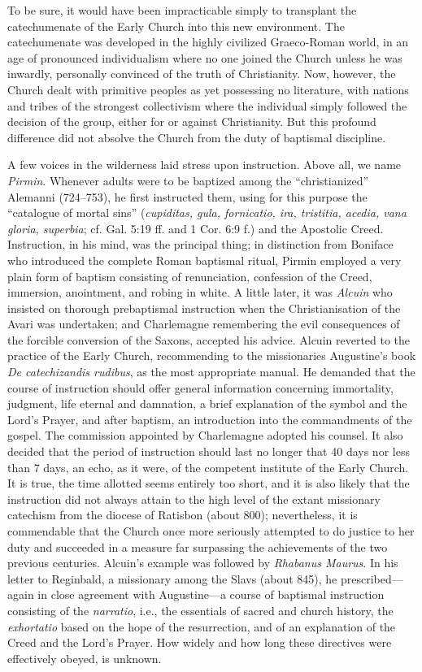 To be sure, it would have been impracticable simply to transplant the catechumenate of the Early Church into this new environment. The catechumenate was developed in the highly civilized Graeco-Roman world, in an age of pronounced individualism where no one joined the Church unless he was inwardly, personally convinced of the truth of Christianity. Now, however, the Church dealt with primitive peoples as yet possessing no literature, with nations and tribes of the strongest collectivism where the individual simply followed the decision of the group, either for or against Christianity. But this profound difference did not absolve the Church from the duty of baptismal discipline.

A few voices in the wilderness laid stress upon instruction.
Above all, we name \emph{Pirmin}. Whenever adults were to be baptized among the “christianized” Alemanni (724–753), he first instructed them, using for this purpose the “catalogue of mortal sins” (\emph{cupiditas, gula, fornicatio, ira, tristitia, acedia, vana gloria, superbia}; cf. Gal. 5:19 ff. and 1 Cor. 6:9 f.) and the Apostolic Creed. Instruction, in his mind, was the principal thing; in distinction from Boniface who introduced the complete Roman baptismal ritual, Pirmin employed a very plain form of baptism consisting of renunciation, confession of the Creed, immersion, anointment, and robing in white. A little later, it was \emph{Alcuin} who insisted on thorough prebaptismal instruction when the Christianisation of the Avari was undertaken; and Charlemagne remembering the evil consequences of the forcible conversion of the Saxons, accepted his advice. Alcuin reverted to the practice of the Early Church, recommending to the missionaries Augustine’s book \emph{De catechizandis rudibus}, as the most appropriate manual. He demanded that the course of instruction should offer general information concerning immortality, judgment, life eternal and damnation, a brief explanation of the symbol and the Lord’s Prayer, and after baptism, an introduction into the commandments of the gospel. The commission appointed by Charlemagne adopted his counsel. It also decided that the period of instruction should last no longer that 40 days nor less than 7 days, an echo, as it were, of the competent institute of the Early Church. It is true, the time allotted seems entirely too short, and it is also likely that the instruction did not always attain to the high level of the extant missionary catechism from the diocese of Ratisbon (about 800); nevertheless, it is commendable that the Church once more seriously attempted to do justice to her duty and succeeded in a measure far surpassing the achievements of the two previous centuries. Alcuin’s example was followed by \emph{Rhabanus Maurus}. In his letter to Reginbald, a missionary among the Slavs (about
845), he prescribed—again in close agreement with Augustine—a course of baptismal instruction consisting of the \emph{narratio}, i.e., the essentials of sacred and church history, the \emph{exhortatio} based on the hope of the resurrection, and of an explanation of the Creed and the Lord’s Prayer. How widely and how long these directives were effectively obeyed, is unknown.

